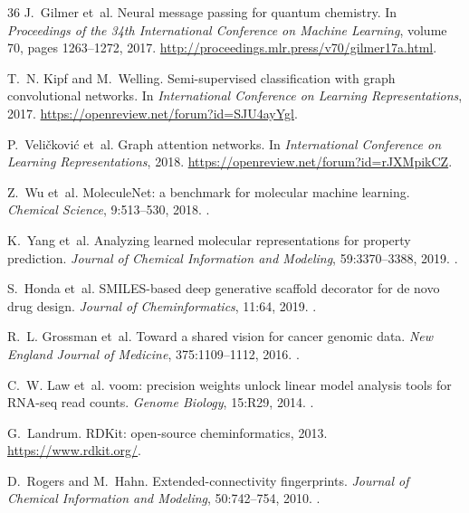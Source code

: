 \begin{thebibliography}{36}
J.~Gilmer et~al.
\newblock Neural message passing for quantum chemistry.
\newblock In \emph{Proceedings of the 34th International Conference on Machine Learning}, volume 70, pages 1263--1272, 2017.
\newblock \url{http://proceedings.mlr.press/v70/gilmer17a.html}.

T.~N. Kipf and M.~Welling.
\newblock Semi-supervised classification with graph convolutional networks.
\newblock In \emph{International Conference on Learning Representations}, 2017.
\newblock \url{https://openreview.net/forum?id=SJU4ayYgl}.

P.~Veli{\v{c}}kovi{\'c} et~al.
\newblock Graph attention networks.
\newblock In \emph{International Conference on Learning Representations}, 2018.
\newblock \url{https://openreview.net/forum?id=rJXMpikCZ}.

Z.~Wu et~al.
\newblock MoleculeNet: a benchmark for molecular machine learning.
\newblock \emph{Chemical Science}, 9:513--530, 2018.
\newblock {}.

K.~Yang et~al.
\newblock Analyzing learned molecular representations for property prediction.
\newblock \emph{Journal of Chemical Information and Modeling}, 59:3370--3388, 2019.
\newblock {}.

S.~Honda et~al.
\newblock SMILES-based deep generative scaffold decorator for de novo drug design.
\newblock \emph{Journal of Cheminformatics}, 11:64, 2019.
\newblock {}.

R.~L. Grossman et~al.
\newblock Toward a shared vision for cancer genomic data.
\newblock \emph{New England Journal of Medicine}, 375:1109--1112, 2016.
\newblock {}.

C.~W. Law et~al.
\newblock voom: precision weights unlock linear model analysis tools for RNA-seq read counts.
\newblock \emph{Genome Biology}, 15:R29, 2014.
\newblock {}.

G.~Landrum.
\newblock RDKit: open-source cheminformatics, 2013.
\newblock \url{https://www.rdkit.org/}.

D.~Rogers and M.~Hahn.
\newblock Extended-connectivity fingerprints.
\newblock \emph{Journal of Chemical Information and Modeling}, 50:742--754, 2010.
\newblock {}.


\end{thebibliography}
